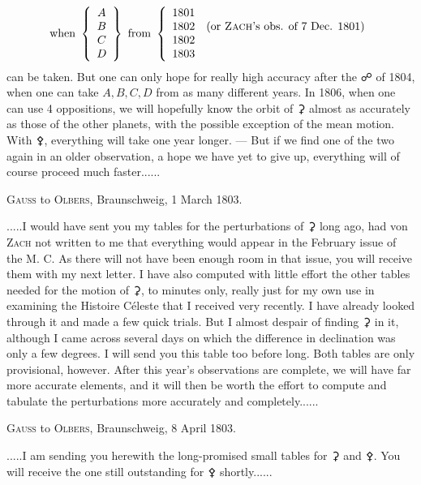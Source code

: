 \[\textstyle
\text{when }\left\{\begin{array}{c}A\\B\\C\\D\end{array}\right\}
\text{ from }\left\{\begin{array}{ll}
1801&\\
1802&\text{(or \textsc{Zach}'s obs. of 7 Dec. 1801)}\\
1802&\\
1803&
\end{array}\right.
\]
can be taken. But one can only hope for really high accuracy after the {\AstroSymbols ☍} of 1804, when one can take \(A,B,C,D\) from as many different years. In 1806, when one can use 4 oppositions, we will hopefully know the orbit of {\AstroSymbols ⚳} almost as accurately as those of the other planets, with the possible exception of the mean motion. With {\AstroSymbols ⚴}, everything will take one year longer. — But if we find one of the two again in an older observation, a hope we have yet to give up, everything will of course proceed much faster.\quad.\quad.\quad.\quad.\quad.

\begin{center}
\textsc{Gauss} to \textsc{Olbers}, Braunschweig, 1 March 1803.
\end{center}
\noindent\hspace*{\parindent}.\quad.\quad.\quad.\quad.\quad I would have sent you my tables for the perturbations of {\AstroSymbols ⚳} long ago, had von \textsc{Zach} not written to me that everything would appear in the February issue of the M. C. As there will not have been enough room in that issue, you will receive them with my next letter. I have also computed with little effort the other tables needed for the motion of {\AstroSymbols ⚳}, to minutes only, really just for my own use in examining the Histoire Céleste that I received very recently. I have already looked through it and made a few quick trials. But I almost despair of finding {\AstroSymbols ⚳} in it, although I came across several days on which the difference in declination was only a few degrees. I will send you this table too before long. Both tables are only provisional, however. After this year's observations are complete, we will have far more accurate elements, and it will then be worth the effort to compute and tabulate the perturbations more accurately and completely.\quad.\quad.\quad.\quad.\quad.

\begin{center}
\textsc{Gauss} to \textsc{Olbers}, Braunschweig, 8 April 1803.
\end{center}
\noindent\hspace*{\parindent}.\quad.\quad.\quad.\quad.\quad I am sending you herewith the long-promised small tables for {\AstroSymbols ⚳} and {\AstroSymbols ⚴}. You will receive the one still outstanding for {\AstroSymbols ⚴} shortly.\quad.\quad.\quad.\quad.\quad.


